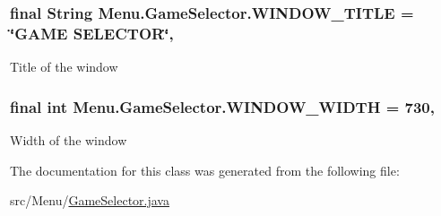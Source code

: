 \subsubsection[{W\+I\+N\+D\+O\+W\+\_\+\+T\+I\+T\+L\+E}]{\setlength{\rightskip}{0pt plus 5cm}final String Menu.\+Game\+Selector.\+W\+I\+N\+D\+O\+W\+\_\+\+T\+I\+T\+L\+E = \char`\"{}G\+A\+M\+E S\+E\+L\+E\+C\+T\+O\+R\char`\"{}\hspace{0.3cm}{\ttfamily [static]}, {\ttfamily [private]}}\label{class_menu_1_1_game_selector_a8170d86254d9973a3c7039dfe166c563}
Title of the window \hypertarget{class_menu_1_1_game_selector_a43fb0db61ebb9549be82751cb984e371}{}
\subsubsection[{W\+I\+N\+D\+O\+W\+\_\+\+W\+I\+D\+T\+H}]{\setlength{\rightskip}{0pt plus 5cm}final int Menu.\+Game\+Selector.\+W\+I\+N\+D\+O\+W\+\_\+\+W\+I\+D\+T\+H = 730\hspace{0.3cm}{\ttfamily [static]}, {\ttfamily [private]}}\label{class_menu_1_1_game_selector_a43fb0db61ebb9549be82751cb984e371}
Width of the window 

The documentation for this class was generated from the following file\+:\begin{DoxyCompactItemize}
\item 
src/\+Menu/\hyperlink{_game_selector_8java}{Game\+Selector.\+java}\end{DoxyCompactItemize}
